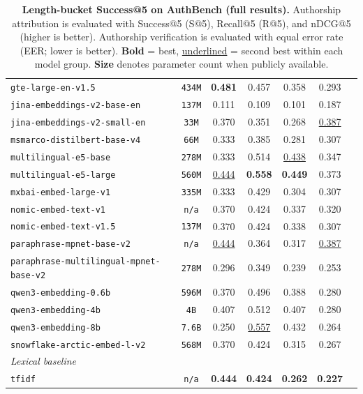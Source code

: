 \documentclass[11pt]{article}
\begin{document}
\begin{table}[htbp]
{\begin{tabular}{lcccccc}
\texttt{gte-large-en-v1.5} & \texttt{434M} & \textbf{0.481} & 0.457 & 0.358 & 0.293 \\
\texttt{jina-embeddings-v2-base-en} & \texttt{137M} & 0.111 & 0.109 & 0.101 & 0.187 \\
\texttt{jina-embeddings-v2-small-en} & \texttt{33M} & 0.370 & 0.351 & 0.268 & \underline{0.387} \\
\texttt{msmarco-distilbert-base-v4} & \texttt{66M} & 0.333 & 0.385 & 0.281 & 0.307 \\
\texttt{multilingual-e5-base} & \texttt{278M} & 0.333 & 0.514 & \underline{0.438} & 0.347 \\
\texttt{multilingual-e5-large} & \texttt{560M} & \underline{0.444} & \textbf{0.558} & \textbf{0.449} & 0.373 \\
\texttt{mxbai-embed-large-v1} & \texttt{335M} & 0.333 & 0.429 & 0.304 & 0.307 \\
\texttt{nomic-embed-text-v1} & \texttt{n/a} & 0.370 & 0.424 & 0.337 & 0.320 \\
\texttt{nomic-embed-text-v1.5} & \texttt{137M} & 0.370 & 0.424 & 0.338 & 0.307 \\
\texttt{paraphrase-mpnet-base-v2} & \texttt{n/a} & \underline{0.444} & 0.364 & 0.317 & \underline{0.387} \\
\texttt{paraphrase-multilingual-mpnet-base-v2} & \texttt{278M} & 0.296 & 0.349 & 0.239 & 0.253 \\
\texttt{qwen3-embedding-0.6b} & \texttt{596M} & 0.370 & 0.496 & 0.388 & 0.280 \\
\texttt{qwen3-embedding-4b} & \texttt{4B} & 0.407 & 0.512 & 0.407 & 0.280 \\
\texttt{qwen3-embedding-8b} & \texttt{7.6B} & 0.250 & \underline{0.557} & 0.432 & 0.264 \\
\texttt{snowflake-arctic-embed-l-v2} & \texttt{568M} & 0.370 & 0.424 & 0.315 & 0.267 \\
\midrule
\multicolumn{6}{l}{\textit{Lexical baseline}} \\
\midrule
\texttt{tfidf} & \texttt{n/a} & \textbf{0.444} & \textbf{0.424} & \textbf{0.262} & \textbf{0.227} \\
\bottomrule
\end{tabular}
}
\caption{\textbf{Length-bucket Success@5 on AuthBench (full results).} Authorship attribution is evaluated with Success@5 (S@5), Recall@5 (R@5), and nDCG@5 (higher is better). Authorship verification is evaluated with equal error rate (EER; lower is better). \textbf{Bold} = best, \underline{underlined} = second best within each model group. \textbf{Size} denotes parameter count when publicly available.}
\label{tab:length-s5-full}
\end{table}
\end{document}

